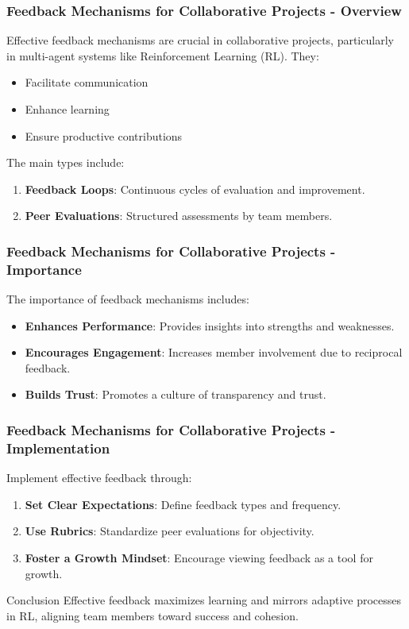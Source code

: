 \documentclass[aspectratio=169]{beamer}
\begin{document}
\begin{frame}[fragile]
    \frametitle{Feedback Mechanisms for Collaborative Projects - Overview}
    Effective feedback mechanisms are crucial in collaborative projects, particularly in multi-agent systems like Reinforcement Learning (RL). They:
    \begin{itemize}
        \item Facilitate communication
        \item Enhance learning
        \item Ensure productive contributions
    \end{itemize}
    The main types include:
    \begin{enumerate}
        \item \textbf{Feedback Loops}: Continuous cycles of evaluation and improvement.
        \item \textbf{Peer Evaluations}: Structured assessments by team members.
    \end{enumerate}
\end{frame}

\begin{frame}[fragile]
    \frametitle{Feedback Mechanisms for Collaborative Projects - Importance}
    The importance of feedback mechanisms includes:
    \begin{itemize}
        \item \textbf{Enhances Performance}: Provides insights into strengths and weaknesses.
        \item \textbf{Encourages Engagement}: Increases member involvement due to reciprocal feedback.
        \item \textbf{Builds Trust}: Promotes a culture of transparency and trust.
    \end{itemize}
\end{frame}

\begin{frame}[fragile]
    \frametitle{Feedback Mechanisms for Collaborative Projects - Implementation}
    Implement effective feedback through:
    \begin{enumerate}
        \item \textbf{Set Clear Expectations}: Define feedback types and frequency.
        \item \textbf{Use Rubrics}: Standardize peer evaluations for objectivity.
        \item \textbf{Foster a Growth Mindset}: Encourage viewing feedback as a tool for growth.
    \end{enumerate}
    \begin{block}{Conclusion}
        Effective feedback maximizes learning and mirrors adaptive processes in RL, aligning team members toward success and cohesion.
    \end{block}
\end{frame}
\end{document}
